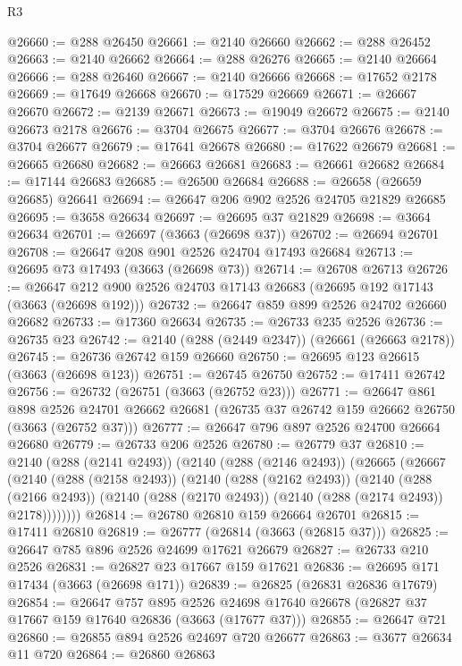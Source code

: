 \begin{lexlean}{R3}
\begin{coremodule}
@26660 := @288 @26450
@26661 := @2140 @26660
@26662 := @288 @26452
@26663 := @2140 @26662
@26664 := @288 @26276
@26665 := @2140 @26664
@26666 := @288 @26460
@26667 := @2140 @26666
@26668 := @17652 @2178
@26669 := @17649 @26668
@26670 := @17529 @26669
@26671 := @26667 @26670
@26672 := @2139 @26671
@26673 := @19049 @26672
@26675 := @2140 @26673 @2178
@26676 := @3704 @26675
@26677 := @3704 @26676
@26678 := @3704 @26677
@26679 := @17641 @26678
@26680 := @17622 @26679
@26681 := @26665 @26680
@26682 := @26663 @26681
@26683 := @26661 @26682
@26684 := @17144 @26683
@26685 := @26500 @26684
@26688 := @26658 (@26659 @26685) @26641
@26694 := @26647 @206 @902 @2526 @24705 @21829 @26685
@26695 := @3658 @26634
@26697 := @26695 @37 @21829
@26698 := @3664 @26634
@26701 := @26697 (@3663 (@26698 @37))
@26702 := @26694 @26701
@26708 := @26647 @208 @901 @2526 @24704 @17493 @26684
@26713 := @26695 @73 @17493 (@3663 (@26698 @73))
@26714 := @26708 @26713
@26726 := @26647 @212 @900 @2526 @24703 @17143 @26683 (@26695 @192 @17143 (@3663 (@26698 @192)))
@26732 := @26647 @859 @899 @2526 @24702 @26660 @26682
@26733 := @17360 @26634
@26735 := @26733 @235 @2526
@26736 := @26735 @23
@26742 := @2140 (@288 (@2449 @2347)) (@26661 (@26663 @2178))
@26745 := @26736 @26742 @159 @26660
@26750 := @26695 @123 @26615 (@3663 (@26698 @123))
@26751 := @26745 @26750
@26752 := @17411 @26742
@26756 := @26732 (@26751 (@3663 (@26752 @23)))
@26771 := @26647
    @861
    @898
    @2526
    @24701
    @26662
    @26681
    (@26735 @37 @26742 @159 @26662 @26750 (@3663 (@26752 @37)))
@26777 := @26647 @796 @897 @2526 @24700 @26664 @26680
@26779 := @26733 @206 @2526
@26780 := @26779 @37
@26810 := @2140
    (@288 (@2141 @2493))
    (@2140
      (@288 (@2146 @2493))
      (@26665
        (@26667
          (@2140
            (@288 (@2158 @2493))
            (@2140
              (@288 (@2162 @2493))
              (@2140
                (@288 (@2166 @2493))
                (@2140 (@288 (@2170 @2493)) (@2140 (@288 (@2174 @2493)) @2178))))))))
@26814 := @26780 @26810 @159 @26664 @26701
@26815 := @17411 @26810
@26819 := @26777 (@26814 (@3663 (@26815 @37)))
@26825 := @26647 @785 @896 @2526 @24699 @17621 @26679
@26827 := @26733 @210 @2526
@26831 := @26827 @23 @17667 @159 @17621
@26836 := @26695 @171 @17434 (@3663 (@26698 @171))
@26839 := @26825 (@26831 @26836 @17679)
@26854 := @26647
    @757
    @895
    @2526
    @24698
    @17640
    @26678
    (@26827 @37 @17667 @159 @17640 @26836 (@3663 (@17677 @37)))
@26855 := @26647 @721
@26860 := @26855 @894 @2526 @24697 @720 @26677
@26863 := @3677 @26634 @11 @720
@26864 := @26860 @26863

\end{coremodule}
\end{lexlean}
